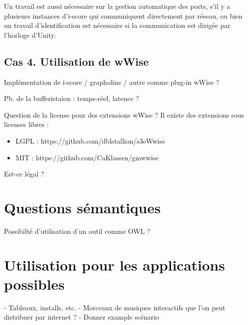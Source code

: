 \documentclass[french,12pt,a4paper]{article}
\begin{document}
Un travail est aussi nécessaire sur la gestion automatique des ports, s'il y a plusieurs instances d'i-score qui communiquent directement par réseau, ou bien un travail d'identification est nécessaire si la communication est dirigée par l'horloge d'Unity.
\subsection{Cas 4. Utilisation de wWise}
Implémentation de i-score / grapholine / autre comme plug-in wWise ?

Pb. de la bufferistaion : temps-réel, latence ?

Question de la license pour des extensions wWise ? 
Il existe des extensions sous licenses libres : 
\begin{itemize}
	\item LGPL : https://github.com/dblstallion/s3eWwise
	\item MIT : https://github.com/CaKlassen/gmwwise
\end{itemize}
Est-ce légal ?
\section{Questions sémantiques}
Possibilté d'utilisation d'un outil comme OWL ?

\section{Utilisation pour les applications possibles}
- Tableaux, installs, etc.
- Morceaux de musiques interactifs que l'on peut distribuer par internet ?
- Donner example scénario
\end{document}
